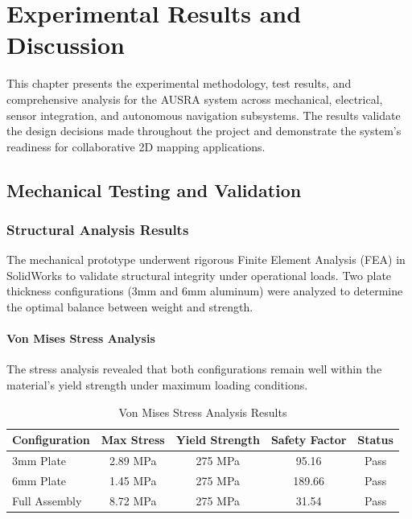 
\chapter{Experimental Results and Discussion}
\label{chap:results}

This chapter presents the experimental methodology, test results, and comprehensive analysis for the AUSRA system across mechanical, electrical, sensor integration, and autonomous navigation subsystems. The results validate the design decisions made throughout the project and demonstrate the system's readiness for collaborative 2D mapping applications.

\section{Mechanical Testing and Validation}
\label{sec:mechanical_testing}

\subsection{Structural Analysis Results}

The mechanical prototype underwent rigorous Finite Element Analysis (FEA) in SolidWorks to validate structural integrity under operational loads. Two plate thickness configurations (3mm and 6mm aluminum) were analyzed to determine the optimal balance between weight and strength.

\subsubsection{Von Mises Stress Analysis}

The stress analysis revealed that both configurations remain well within the material's yield strength under maximum loading conditions.

\begin{table}[H]
\centering
\caption{Von Mises Stress Analysis Results}
\label{tab:stress_results}
\begin{tabular}{|l|c|c|c|c|}
\hline
\textbf{Configuration} & \textbf{Max Stress} & \textbf{Yield Strength} & \textbf{Safety Factor} & \textbf{Status} \\
\hline
3mm Plate & 2.89 MPa & 275 MPa & 95.16 & Pass \\
6mm Plate & 1.45 MPa & 275 MPa & 189.66 & Pass \\
Full Assembly & 8.72 MPa & 275 MPa & 31.54 & Pass \\
\hline
\end{tabular}
\end{table}

